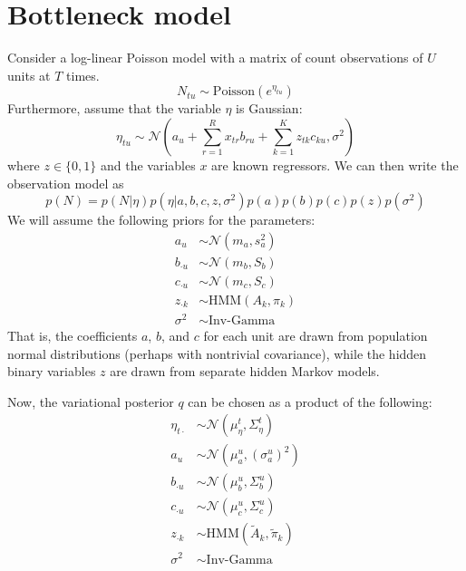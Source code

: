 \documentclass[11pt]{article}
\begin{document}
\section{Bottleneck model}
Consider a log-linear Poisson model with a matrix of count observations of $U$ units at $T$ times.
\begin{equation}
    N_{tu} \sim \mathrm{Poisson}(e^{\eta_{tu}})
\end{equation}
Furthermore, assume that the variable $\eta$ is Gaussian:
\begin{equation}
    \eta_{tu} \sim \mathcal{N}\left(a_{u} + \sum_{r=1}^R x_{tr} b_{ru} + 
    \sum_{k=1}^K z_{tk} c_{ku}, \sigma^2\right)
\end{equation}
where $z \in \{0, 1\}$ and the variables $x$ are known regressors. We can then write the observation model as 
\begin{equation}
    p(N) = p(N|\eta) p(\eta|a, b, c, z, \sigma^2) p(a) p(b) p(c) p(z) p(\sigma^2)
\end{equation}
We will assume the following priors for the parameters:
\begin{align}
    a_u &\sim \mathcal{N}(m_a, s_a^2) \\
    b_{\cdot u} &\sim \mathcal{N}(m_b, S_b) \\
    c_{\cdot u} &\sim \mathcal{N}(m_c, S_c) \\
    z_{\cdot k} &\sim \mathrm{HMM}(A_k, \pi_k) \\
    \sigma^2 &\sim \text{Inv-Gamma}
\end{align}
That is, the coefficients $a$, $b$, and $c$ for each unit are drawn from population normal distributions (perhaps with nontrivial covariance), while the hidden binary variables $z$ are drawn from separate hidden Markov models.

Now, the variational posterior $q$ can be chosen as a product of the following:
\begin{align}
    \eta_{t\cdot} &\sim \mathcal{N}(\mu^t_\eta, \Sigma^t_\eta) \\
    a_u &\sim \mathcal{N}(\mu^u_a, (\sigma^u_a)^2) \\
    b_{\cdot u} &\sim \mathcal{N}(\mu^u_b, \Sigma^u_b) \\
    c_{\cdot u} &\sim \mathcal{N}(\mu^u_c, \Sigma^u_c) \\
    z_{\cdot k} &\sim \mathrm{HMM}(\tilde{A}_k, \tilde{\pi}_k) \\
    \sigma^2 &\sim \text{Inv-Gamma}
\end{align}
\end{document}
